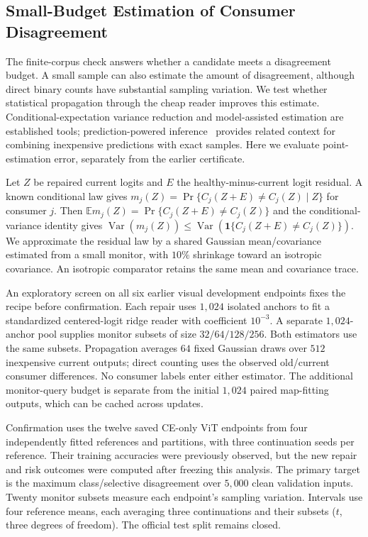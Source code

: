 \subsection{Small-Budget Estimation of Consumer Disagreement}\label{app:query_risk}

The finite-corpus check answers whether a candidate meets a disagreement
budget. A small sample can also estimate the amount of disagreement, although
direct binary counts have substantial sampling variation. We test whether
statistical propagation through the cheap reader improves this estimate.
Conditional-expectation variance reduction and model-assisted estimation are
established tools; prediction-powered inference~\citep{angelopoulos2023ppi}
provides related context for combining inexpensive predictions with exact samples.
Here we evaluate point-estimation error, separately from the earlier certificate.

Let $Z$ be repaired current logits and $E$ the healthy-minus-current logit
residual. A known conditional law gives
$m_j(Z)=\Pr\{C_j(Z+E)\ne C_j(Z)\mid Z\}$ for consumer $j$.
Then $\mathbb E m_j(Z)=\Pr\{C_j(Z+E)\ne C_j(Z)\}$ and the conditional-variance
identity gives $\operatorname{Var}(m_j(Z))\le\operatorname{Var}(\mathbf1\{C_j(Z+E)\ne C_j(Z)\})$.
We approximate the residual law by a shared Gaussian mean/covariance estimated
from a small monitor, with $10\%$ shrinkage toward an isotropic covariance.
An isotropic comparator retains the same mean and covariance trace.

An exploratory screen on all six earlier visual development endpoints fixes the
recipe before confirmation. Each repair uses $1{,}024$ isolated anchors to fit
a standardized centered-logit ridge reader with coefficient $10^{-3}$.
A separate $1{,}024$-anchor pool supplies monitor subsets of size $32/64/128/256$.
Both estimators use the same subsets. Propagation averages $64$ fixed Gaussian
draws over $512$ inexpensive current outputs; direct counting uses the observed
old/current consumer differences. No consumer labels enter either estimator.
The additional monitor-query budget is separate from the initial $1{,}024$
paired map-fitting outputs, which can be cached across updates.

Confirmation uses the twelve saved CE-only ViT endpoints from four independently
fitted references and partitions, with three continuation seeds per reference.
Their training accuracies were previously observed, but the new repair and risk
outcomes were computed after freezing this analysis. The primary target is the
maximum class/selective disagreement over $5{,}000$ clean validation inputs.
Twenty monitor subsets measure each endpoint's sampling variation. Intervals
use four reference means, each averaging three continuations and their subsets
($t$, three degrees of freedom). The official test split remains closed.

